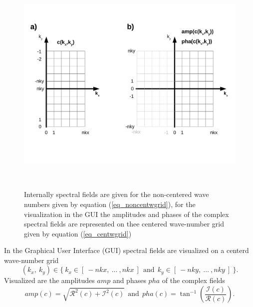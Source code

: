 \begin{figure} \label{fig_cspecgrid}
   \includegraphics[height=11cm]{figures/cmplx_cent_grid.pdf}
   \caption{Internally spectral fields are given for the non-centered
            wave numbers given by equation (\ref{eq_noncentwgrid}), 
            for the visualization in the GUI the amplitudes and phases 
            of the complex spectral fields are represented on thee centered
            wave-number grid given by equation (\ref{eq_centwgrid})}
\end{figure}
In the Graphical User Interface (GUI) spectral fields are visualized on
a centerd wave-number grid
\begin{equation} \label{eq_centwgrid}
   (k_{x},\ k_{y}) \in  
   \{\ k_{x} \in [\ -nkx, \ \dots \ ,nkx \ ] 
    \ \ \mbox{and} \ \ 
       k_{y} \in [\ -nky, \ \dots \ ,nky \ ] \ \}.
\end{equation}
Visualized are the amplitudes $amp$ and phases $pha$ of the 
complex fields
\begin{equation} \label{eq_amppha}
   amp(c) = \sqrt{\mathcal{R}^{2}(c) + \mathcal{I}^{2}(c)}
   \ \ \mbox{and} \ \ 
   pha(c) = \tan^{-1}(\frac{\mathcal{I}(c)}{\mathcal{R}(c)}).
\end{equation}


